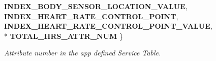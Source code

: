 \begin{DoxyCompactItemize}
{\bfseries I\+N\+D\+E\+X\+\_\+\+B\+O\+D\+Y\+\_\+\+S\+E\+N\+S\+O\+R\+\_\+\+L\+O\+C\+A\+T\+I\+O\+N\+\_\+\+V\+A\+L\+UE}, 
{\bfseries I\+N\+D\+E\+X\+\_\+\+H\+E\+A\+R\+T\+\_\+\+R\+A\+T\+E\+\_\+\+C\+O\+N\+T\+R\+O\+L\+\_\+\+P\+O\+I\+NT}, 
{\bfseries I\+N\+D\+E\+X\+\_\+\+H\+E\+A\+R\+T\+\_\+\+R\+A\+T\+E\+\_\+\+C\+O\+N\+T\+R\+O\+L\+\_\+\+P\+O\+I\+N\+T\+\_\+\+V\+A\+L\+UE}, 
\\*
{\bfseries T\+O\+T\+A\+L\+\_\+\+H\+R\+S\+\_\+\+A\+T\+T\+R\+\_\+\+N\+UM}
 \}\hypertarget{group___b_l_e___h_r_s_ga0804d16a5e96316dee3d48a5eed71644}{}\label{group___b_l_e___h_r_s_ga0804d16a5e96316dee3d48a5eed71644}
\begin{DoxyCompactList}\small\item\em Attribute number in the app defined Service Table. \end{DoxyCompactList}
\end{DoxyCompactItemize}
